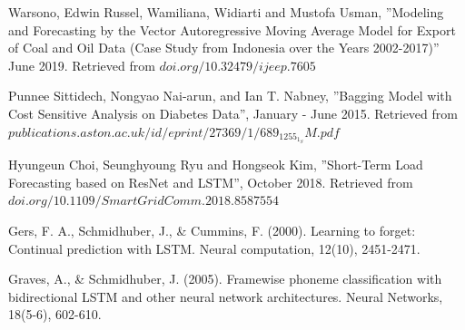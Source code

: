 \documentclass{ieeeojies}
\begin{document}
\begin{thebibliography}{00}

 Warsono, Edwin Russel, Wamiliana, Widiarti and Mustofa Usman, ''Modeling and Forecasting by the Vector Autoregressive Moving
Average Model for Export of Coal and Oil Data (Case Study from
Indonesia over the Years 2002-2017)'' June 2019. Retrieved from \(doi.org/10.32479/ijeep.7605\)

 Punnee Sittidech, Nongyao Nai-arun, and Ian T. Nabney, ''Bagging Model with Cost Sensitive Analysis on Diabetes Data'', January - June 2015. Retrieved from \(publications.aston.ac.uk/id/eprint/27369/1/689_1255_1_SM.pdf\)

 Hyungeun Choi, Seunghyoung Ryu and Hongseok Kim, ''Short-Term Load Forecasting based on ResNet and LSTM'', October 2018. Retrieved from \(doi.org/10.1109/SmartGridComm.2018.8587554\)

 Gers, F. A., Schmidhuber, J., & Cummins, F. (2000). Learning to forget: Continual prediction with LSTM. Neural computation, 12(10), 2451-2471. \

 Graves, A., & Schmidhuber, J. (2005). Framewise phoneme classification with bidirectional LSTM and other neural network architectures. Neural Networks, 18(5-6), 602-610. \
\end{thebibliography}


\EOD
\end{document}
